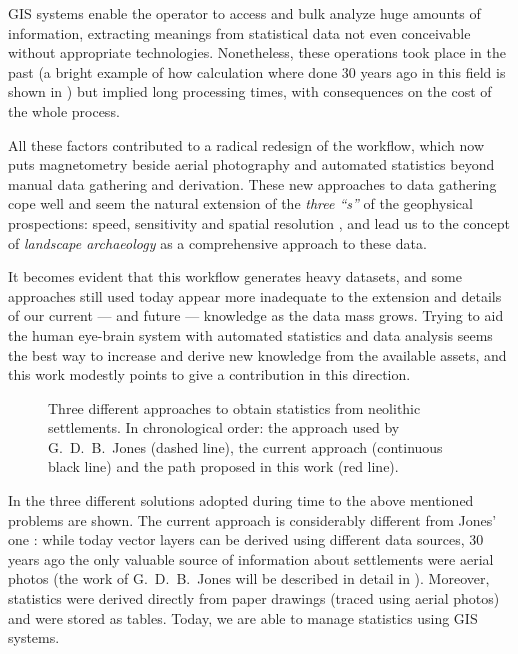         GIS systems enable the operator to access and bulk analyze huge amounts of information, extracting meanings from statistical data not even conceivable without appropriate technologies. Nonetheless, these operations took place in the past (a bright example of how calculation where done 30 years ago in this field is shown in \cite{jones-tavoliere}) but implied long processing times, with consequences on the cost of the whole process.

        All these factors contributed to a radical redesign of the workflow, which now puts magnetometry beside aerial photography and automated statistics beyond manual data gathering and derivation. These new approaches to data gathering cope well and seem the natural extension of the \emph{three ``s''} of the geophysical prospections: speed, sensitivity and spatial resolution \cite[p.~130]{becker}, and lead us to the concept of \emph{landscape archaeology} as a comprehensive approach to these data.

        It becomes evident that this workflow generates heavy datasets, and some approaches still used today appear more inadequate to the extension and details of our current --- and future --- knowledge as the data mass grows. Trying to aid the human eye-brain system with automated statistics and data analysis seems the best way to increase and derive new knowledge from the available assets, and this work modestly points to give a contribution in this direction.

        \begin{figure}[H]
            \centering
            \resizebox{1\textwidth}{!}{%
                \begin{tikzpicture}
                    
                \end{tikzpicture}
            }
            \caption[Statistics from settlements: the Jones' approach, the current one and the proposed one]{Three different approaches to obtain statistics from neolithic settlements. In chronological order: the approach used by G.\ D.\ B.\ Jones (dashed line), the current approach (continuous black line) and the path proposed in this work (red line).}
            \label{fig:scheme-general}
        \end{figure}

        In  the three different solutions adopted during time to the above mentioned problems are shown. The current approach is considerably different from Jones' one \cite{jones-tavoliere}: while today vector layers can be derived using different data sources, 30 years ago the only valuable source of information about settlements were aerial photos (the work of G.\ D.\ B.\ Jones will be described in detail in ). Moreover, statistics were derived directly from paper drawings (traced using aerial photos) and were stored as tables. Today, we are able to manage statistics using GIS systems.
        
